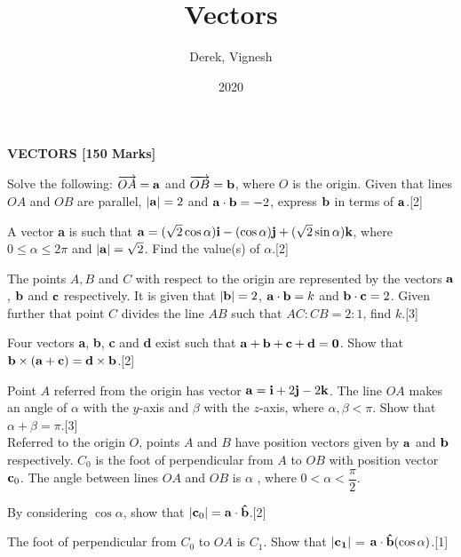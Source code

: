\documentclass[12pt, a4 paper]{article}
\title{Vectors}
\author{Derek, Vignesh}
\date{2020}
\begin{document}
\maketitle
\textbf{VECTORS [150 Marks]}
\begin{outline}[enumerate]
	\1 Solve the following:
	\2 $\overrightarrow {OA}  = {\bf{a}}$ and $\overrightarrow {OB}  = {\bf{b}}$, where $O$ is the origin. Given that lines $OA$ and $OB$ are parallel, $\left| {\bf{a}} \right| = 2$ and ${\bf{a}} \cdot {\bf{b}} =  - 2$, express $\bf{b}$ in terms of $\bf{a}$.\hfill[2]

	\2 A vector \textbf{a} is such that ${\bf{a}} = (\sqrt 2 \cos \alpha ){\bf{i}} - (\cos \alpha ){\bf{j}} + (\sqrt 2 \sin \alpha ){\bf{k}}$, where $0 \le \alpha  \le 2\pi $ and $\left| {\bf{a}} \right| = \sqrt 2 $. Find the value(s) of $\alpha $.\hfill[2]

	\2 The points $A, B$ and $C$ with respect to the origin are represented by the vectors ${\bf{a}}$, ${\bf{b}}$ and ${\bf{c}}$ respectively. It is given that $\left| {\bf{b}} \right| = 2$, ${\bf{a}} \cdot {\bf{b}} = k$ and ${\bf{b}} \cdot {\bf{c}} = 2$. Given further that point $C$ divides the line $AB$ such that $AC:CB = 2:1$, find $k$.\hfill[3]

	\2 Four vectors \textbf{a}, \textbf{b}, \textbf{c} and \textbf{d} exist such that ${\bf{a}} + {\bf{b}} + {\bf{c}} + {\bf{d}} = {\bf{0}}$. Show that ${\bf{b}} \times ({\bf{a}} + {\bf{c}}) = {\bf{d}} \times {\bf{b}}$.\hfill[2]

	\2 Point $A$ referred from the origin has vector ${\bf{a}} = {\bf{i}} + 2{\bf{j}} - 2{\bf{k}}$. The line $OA$ makes an angle of $\alpha $ with the $y$-axis and $\beta $ with the $z$-axis, where $\alpha ,\beta  < \pi $. Show that $\alpha  + \beta  = \pi $.\hfill[3]\\

	\1 Referred to the origin $O$, points $A$ and $B$ have position vectors given by ${\bf{a}}$ and ${\bf{b}}$ respectively. ${C_0}$ is the foot of perpendicular from $A$ to $OB$ with position vector ${{\bf{c}}_0}$. The angle between lines $OA$ and $OB$ is $\alpha$ , where $ 0< \alpha  < \dfrac{\pi}{2}$.

	\2 By considering $\cos{\alpha}$, show that $|{\bf{c}}_0|= {\bf{a}} \cdot {\bf{\hat b}}$.\hfill[2]

	\2 The foot of perpendicular from ${C_0}$ to $OA$ is ${C_1}$. Show that $|\bf{c}_1|$ = ${\bf{a}} \cdot {\bf{\hat b}}(\cos \alpha )$.\hfill[1]\\


\end{outline}
\end{document}
